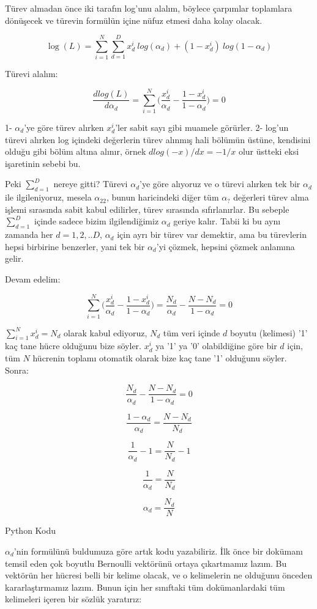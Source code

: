 \documentclass[12pt,fleqn]{article}\usepackage{../../common}
\begin{document}
Türev almadan önce iki tarafın log'unu alalım, böylece çarpımlar toplamlara
dönüşecek ve türevin formülün içine nüfuz etmesi daha kolay olacak.

$$ \log(L) = \sum_{i=1}^N \sum_{d=1}^{D} {x_d^i}\ log (\alpha_d) + 
(1-x_d^i)\ log (1-\alpha_d) $$

Türevi alalım:

$$ \frac{dlog(L)}{d\alpha_d} = \sum_{i=1}^N \bigg( \frac{x_d^i}{\alpha_d} -
\frac{1-x_d^i}{1-\alpha_d} \bigg) = 0
 $$

1- $\alpha_d$'ye göre türev alırken $x_d^i$'ler sabit sayı gibi muamele
görürler. 2- log'un türevi alırken log içindeki değerlerin türev alınmış hali
bölümün üstüne, kendisini olduğu gibi bölüm altına alınır, örnek 
$dlog(-x)/dx = -1/x$ olur üstteki eksi işaretinin sebebi bu. 

Peki $\sum_{d=1}^{D}$ nereye gitti? Türevi $\alpha_d$'ye göre alıyoruz ve o
türevi alırken tek bir $\alpha_d$ ile ilgileniyoruz, mesela $\alpha_{22}$,
bunun haricindeki diğer tüm $\alpha_?$ değerleri türev alma işlemi
sırasında sabit kabul edilirler, türev sırasında sıfırlanırlar. Bu sebeple
$\sum_{d=1}^{D}$ içinde sadece bizim ilgilendiğimiz $\alpha_d$ geriye
kalır. Tabii ki bu aynı zamanda her $d=1,2,..D$, $\alpha_d$ için ayrı bir
türev var demektir, ama bu türevlerin hepsi birbirine benzerler, yani tek
bir $\alpha_d$'yi çözmek, hepsini çözmek anlamına gelir.

Devam edelim:

$$ \sum_{i=1}^N \bigg( \frac{x_d^i}{\alpha_d} - \frac{1-x_d^i}{1-\alpha_d} \bigg) =
\frac{N_d}{\alpha_d} - \frac{N-N_d}{1-\alpha_d} = 0
 $$

$\sum_{i=1}^N x_d^i = N_d$ olarak kabul ediyoruz, $N_d$ tüm veri içinde $d$
boyutu (kelimesi) '1' kaç tane hücre olduğunu bize söyler. $x_d^i$ ya '1' ya '0'
olabildiğine göre bir $d$ için, tüm $N$ hücrenin toplamı otomatik olarak bize
kaç tane '1' olduğunu söyler. Sonra:

$$ \frac{N_d}{\alpha_d} - \frac{N-N_d}{1-\alpha_d} = 0  $$

$$ \frac{1-\alpha_d}{\alpha_d} = \frac{N-N_d}{N_d}   $$

$$ \frac{1}{\alpha_d} - 1 = \frac{N}{N_d} - 1  $$

$$ \frac{1}{\alpha_d} = \frac{N}{N_d}  $$

$$ \alpha_d = \frac{N_d}{N}  $$

Python Kodu

$\alpha_d$'nin formülünü buldumuza göre artık kodu yazabiliriz. İlk önce bir
dokümanı temsil eden çok boyutlu Bernoulli vektörünü ortaya çıkartmamız
lazım. Bu vektörün her hücresi belli bir kelime olacak, ve o kelimelerin ne
olduğunu önceden kararlaştırmamız lazım. Bunun için her sınıftaki tüm
dokümanlardaki tüm kelimeleri içeren bir sözlük yaratırız:
\end{document}
